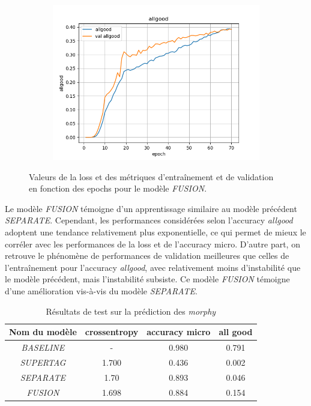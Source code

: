 \documentclass[a4paper]{article}
\begin{document}
\begin{figure}[H]
\begin{subfigure}{0.32\textwidth}
        \includegraphics[width=\linewidth]{../logs/fusion/allgood.png}
    \end{subfigure}
    \caption{Valeurs de la loss et des métriques d'entraînement et de validation en fonction des epochs 
            pour le modèle \textit{FUSION}.}
    \label{fig: results fusion}
\end{figure}

Le modèle \textit{FUSION} témoigne d'un apprentissage similaire au modèle précédent \textit{SEPARATE}. Cependant, les performances considérées selon l'accuracy \textit{allgood} adoptent une tendance relativement plus exponentielle, ce qui permet de mieux le corréler avec les performances de la loss et de l'accuracy micro. D'autre part, on retrouve le phénomène de performances de validation meilleures que celles de l'entraînement pour l'accuracy \textit{allgood}, avec relativement moins d'instabilité que le modèle précédent, mais l'instabilité subsiste. Ce modèle \textit{FUSION} témoigne d'une amélioration vis-à-vis du modèle \textit{SEPARATE}.


\begin{table}[H]
    \centering
    \begin{tabular}{|c|c|c|c|}
        \hline
         Nom du modèle & crossentropy & accuracy micro & all good\\
         \hline
         \textit{BASELINE}& - & 0.980 & 0.791 \\
         \hline
         \textit{SUPERTAG}& 1.700 & 0.436 & 0.002\\
         \hline
         \textit{SEPARATE}& 1.70 & 0.893 & 0.046\\
         \hline
         \textit{FUSION}& 1.698 & 0.884 & 0.154 \\
         \hline
    \end{tabular}
    \caption{Résultats de test sur la prédiction des \textit{morphy}}
    \label{tab: test morphy}
\end{table}
\end{document}
